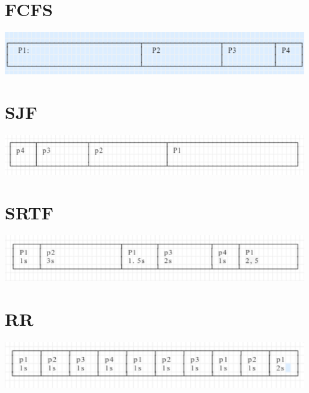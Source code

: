 \documentclass{article}
\begin{document}
\section{FCFS}
\includegraphics{02.report.scheduling.FCFS}

\section{SJF}
\includegraphics{02.report.scheduling.SJF}

\section{SRTF}
\includegraphics{02.report.scheduling.SRTF}

\section{RR}
\includegraphics{02.report.scheduling.RR}
\end{document}
